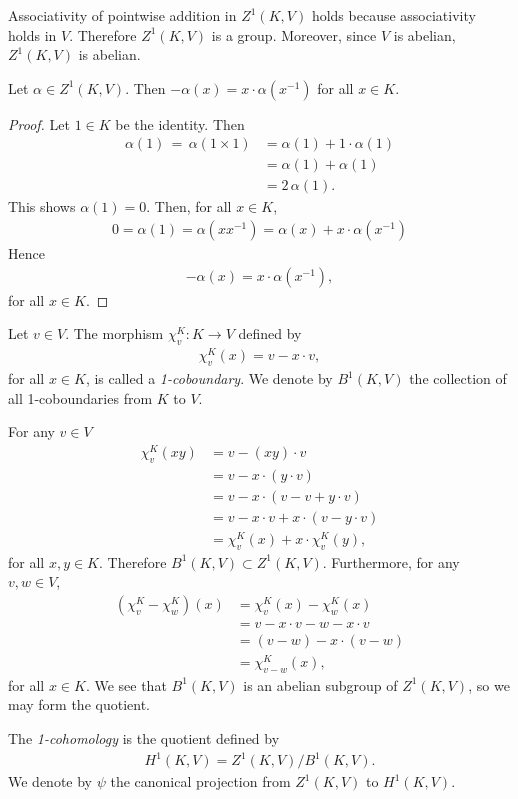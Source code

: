 Associativity of pointwise addition in $Z^1(K, V)$ holds because associativity holds in $V$. Therefore $Z^1\left(K, V\right)$ is a group. Moreover, since $V$ is abelian, $Z^1(K, V)$ is abelian.
\begin{lemma} Let $\alpha \in Z^1(K, V)$. Then $-\alpha(x) = x \cdot \alpha(x^{-1})$ for all $x \in K$.
\end{lemma}
\begin{proof}
Let $1\in K$ be the identity. Then
\begin{align*}
	\alpha(1)\, =\, \alpha(1\times 1) &=  \alpha(1) + 1\cdot \alpha(1) \\
	&=  \alpha(1) + \alpha(1) \\
	&=  2\,\alpha(1).
\end{align*}
This shows $\alpha(1) = 0$. Then, for all $x \in K$,
\begin{align*}
	0 = \alpha(1) = \alpha(xx^{-1}) = \alpha(x) + x \cdot \alpha(x^{-1})
\end{align*}
Hence
\begin{align*}
	-\alpha(x) = x\cdot\alpha(x^{-1}),
\end{align*}
for all $x \in K$. 
\end{proof}

\begin{definition} Let $v \in V$. The morphism $\chi^K_v:K\rightarrow V$ defined by
\begin{align*}
	\chi^K_v (x) = v - x\cdot v,
\end{align*}
for all $x \in K$, is called a \emph{1-coboundary}. We denote by $B^1\left(K, V\right)$ the collection of all 1-coboundaries from $K$ to $V$. 
\end{definition}

For any $v \in V$
\begin{align*}
	\chi^K_v(xy) &=  v - (xy)\cdot v \\
	&=  v - x \cdot \left(y\cdot v \right)\\
	&=  v - x \cdot \left(v -v + y\cdot v \right)\\
	&=  v - x\cdot v + x\cdot \left( v - y\cdot v\right)\\
	&=  \chi^K_v(x) + x\cdot \chi^K_v(y),
\end{align*}
for all $x, y \in K$. Therefore $B^1(K, V) \subset Z^1(K, V)$.
Furthermore, for any $v, w \in V$,
\begin{align*}
	(\chi^K_v - \chi^K_w)(x) &=  \chi^K_v(x) - \chi^K_w(x)\\
	&=  v - x \cdot v - w - x\cdot v \\
	&=  (v - w) - x\cdot (v - w) \\
	&=  \chi^K_{v - w} (x),
\end{align*}
for all $x \in K$. We see that $B^1\left(K, V\right)$ is an abelian subgroup of $Z^1(K, V)$, so we may form the quotient.
\begin{definition} The \emph{1-cohomology} is the quotient defined by
\begin{align*}
	H^1\left(K, V\right) = Z^1\left(K, V\right) / B^1\left(K, V\right).
\end{align*}
We denote by $\psi$ the canonical projection from $Z^1(K, V)$ to $H^1(K, V)$.
\end{definition}

